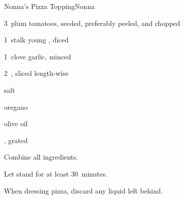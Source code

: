 \begin{recipe}{Nonna's Pizza Topping}{Nonna}{}

\begin{ingredients}
\item 3~plum tomatoes, seeded, preferably peeled, and chopped
\item 1~stalk young , diced
\item 1~clove garlic, minced
\item 2~, sliced length-wise
\item salt
\item oregano
\item olive oil
\item {}, grated
\end{ingredients}

\begin{directions}
\item Combine all ingredients.
\item Let stand for at least 30~minutes.
\item When dressing pizza, discard any liquid left behind.
\end{directions}

\end{recipe}
